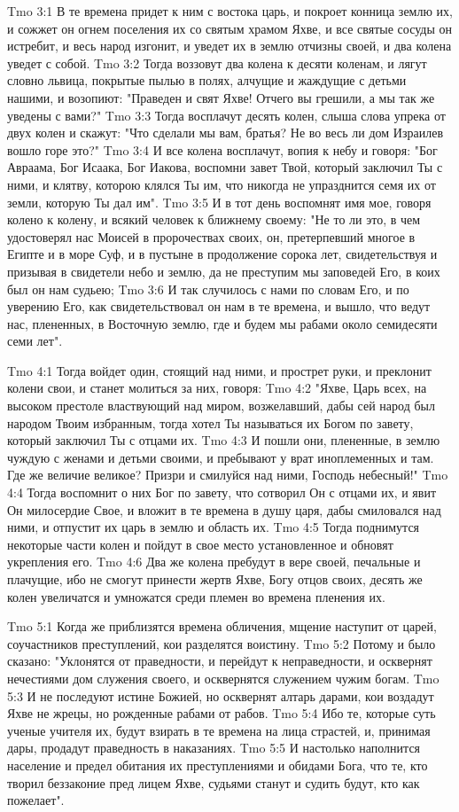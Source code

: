 \vs Tmo 3:1
В те времена придет к ним с востока царь, и покроет конница землю их, и сожжет он огнем поселения их со святым храмом Яхве, и все святые сосуды он истребит, и весь народ изгонит, и уведет их в землю отчизны своей, и два колена уведет с собой.
\vs Tmo 3:2
Тогда воззовут два колена к десяти коленам, и лягут словно львица, покрытые пылью в полях, алчущие и жаждущие с детьми нашими, и возопиют: "Праведен и свят Яхве! Отчего вы грешили, а мы так же уведены с вами?"
\vs Tmo 3:3
Тогда восплачут десять колен, слыша слова упрека от двух колен и скажут: "Что сделали мы вам, братья? Не во весь ли дом Израилев вошло горе это?"
\vs Tmo 3:4
И все колена восплачут, вопия к небу и говоря: "Бог Авраама, Бог Исаака, Бог Иакова, воспомни завет Твой, который заключил Ты с ними, и клятву, которою клялся Ты им, что никогда не упразднится семя их от земли, которую Ты дал им".
\vs Tmo 3:5
И в тот день воспомнят имя мое, говоря колено к колену, и всякий человек к ближнему своему: "Не то ли это, в чем удостоверял нас Моисей в пророчествах своих, он, претерпевший многое в Египте и в море Суф, и в пустыне в продолжение сорока лет, свидетельствуя и призывая в свидетели небо и землю, да не преступим мы заповедей Его, в коих был он нам судьею;
\vs Tmo 3:6
И так случилось с нами по словам Его, и по уверению Его, как свидетельствовал он нам в те времена, и вышло, что ведут нас, плененных, в Восточную землю, где и будем мы рабами около семидесяти семи лет".

\vs Tmo 4:1
Тогда войдет один, стоящий над ними, и прострет руки, и преклонит колени свои, и станет молиться за них, говоря:
\vs Tmo 4:2
"Яхве, Царь всех, на высоком престоле властвующий над миром, возжелавший, дабы сей народ был народом Твоим избранным, тогда хотел Ты называться их Богом по завету, который заключил Ты с отцами их.
\vs Tmo 4:3
И пошли они, плененные, в землю чуждую с женами и детьми своими, и пребывают у врат иноплеменных и там. Где же величие великое? Призри и смилуйся над ними, Господь небесный!"
\vs Tmo 4:4
Тогда воспомнит о них Бог по завету, что сотворил Он с отцами их, и явит Он милосердие Свое, и вложит в те времена в душу царя, дабы смиловался над ними, и отпустит их царь в землю и область их.
\vs Tmo 4:5
Тогда поднимутся некоторые части колен и пойдут в свое место установленное и обновят укрепления его.
\vs Tmo 4:6
Два же колена пребудут в вере своей, печальные и плачущие, ибо не смогут принести жертв Яхве, Богу отцов своих, десять же колен увеличатся и умножатся среди племен во времена пленения их.

\vs Tmo 5:1
Когда же приблизятся времена обличения, мщение наступит от царей, соучастников преступлений, кои разделятся воистину.
\vs Tmo 5:2
Потому и было сказано: "Уклонятся от праведности, и перейдут к неправедности, и осквернят нечестиями дом служения своего, и осквернятся служением чужим богам.
\vs Tmo 5:3
И не последуют истине Божией, но осквернят алтарь дарами, кои воздадут Яхве не жрецы, но рожденные рабами от рабов.
\vs Tmo 5:4
Ибо те, которые суть ученые учителя их, будут взирать в те времена на лица страстей, и, принимая дары, продадут праведность в наказаниях.
\vs Tmo 5:5
И настолько наполнится население и предел обитания их преступлениями и обидами Бога, что те, кто творил беззаконие пред лицем Яхве, судьями станут и судить будут, кто как пожелает".

